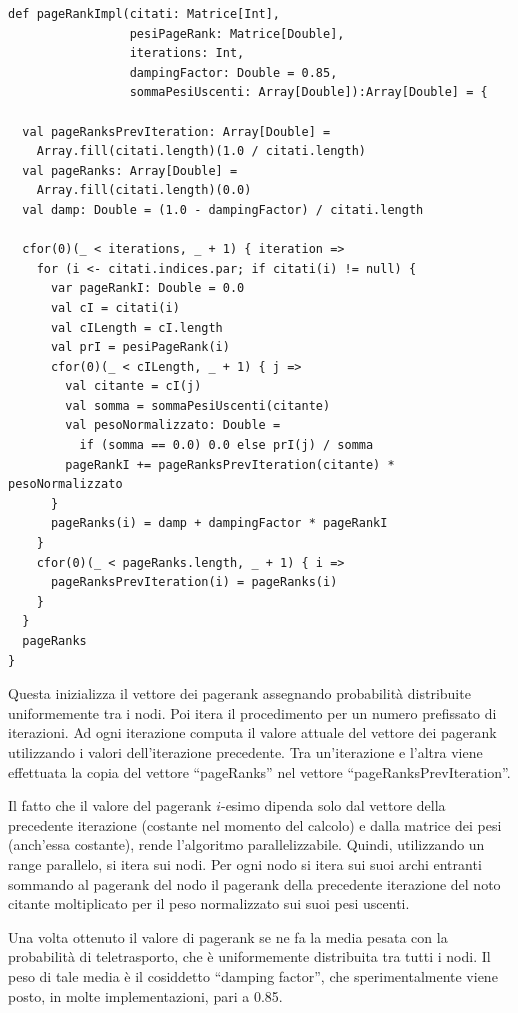 \documentclass[a4paper, 12pt]{article}
\begin{document}
\begin{lstlisting}[keepspaces=true]
def pageRankImpl(citati: Matrice[Int],
                 pesiPageRank: Matrice[Double],
                 iterations: Int,
                 dampingFactor: Double = 0.85,
                 sommaPesiUscenti: Array[Double]):Array[Double] = {

  val pageRanksPrevIteration: Array[Double] =
    Array.fill(citati.length)(1.0 / citati.length)
  val pageRanks: Array[Double] =
    Array.fill(citati.length)(0.0)
  val damp: Double = (1.0 - dampingFactor) / citati.length

  cfor(0)(_ < iterations, _ + 1) { iteration =>
    for (i <- citati.indices.par; if citati(i) != null) {
      var pageRankI: Double = 0.0
      val cI = citati(i)
      val cILength = cI.length
      val prI = pesiPageRank(i)
      cfor(0)(_ < cILength, _ + 1) { j =>
        val citante = cI(j)
        val somma = sommaPesiUscenti(citante)
        val pesoNormalizzato: Double =
          if (somma == 0.0) 0.0 else prI(j) / somma
        pageRankI += pageRanksPrevIteration(citante) * pesoNormalizzato
      }
      pageRanks(i) = damp + dampingFactor * pageRankI
    }
    cfor(0)(_ < pageRanks.length, _ + 1) { i =>
      pageRanksPrevIteration(i) = pageRanks(i)
    }
  }
  pageRanks
}
\end{lstlisting}
Questa inizializza il vettore dei pagerank assegnando probabilità distribuite uniformemente tra i nodi.
Poi itera il procedimento per un numero prefissato di iterazioni. Ad ogni iterazione computa il valore attuale del vettore dei pagerank utilizzando i valori dell'iterazione precedente. Tra un'iterazione e l'altra viene effettuata la copia del vettore ``pageRanks'' nel vettore ``pageRanksPrevIteration''.
\par
Il fatto che il valore del pagerank $i$-esimo dipenda solo dal vettore della precedente iterazione (costante nel momento del calcolo) e dalla matrice dei pesi (anch'essa costante), rende l'algoritmo parallelizzabile.
Quindi, utilizzando un range parallelo, si itera sui nodi. Per ogni nodo si itera sui suoi archi entranti sommando al pagerank del nodo il pagerank della precedente iterazione del noto citante moltiplicato per il peso normalizzato sui suoi pesi uscenti.
\par
Una volta ottenuto il valore di pagerank se ne fa la media pesata con la probabilità di teletrasporto, che è uniformemente distribuita tra tutti i nodi. Il peso di tale media è il cosiddetto ``damping factor'', che sperimentalmente viene posto, in molte implementazioni, pari a 0.85. 
\end{document}
